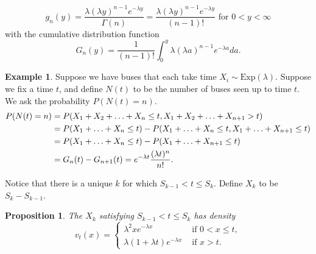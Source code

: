 \documentclass[15pt,a4paper]{book}
\newtheorem{proposition}[theorem]{Proposition}
\theoremstyle{definition}
\newtheorem{example}[theorem]{Example}
\begin{document}
\begin{equation}
    g_{n}(y) = \frac{\lambda(\lambda y)^{n-1}e^{-\lambda y}}{\Gamma(n)} = \frac{\lambda(\lambda y)^{n-1}e^{-\lambda y}}{(n-1)!} \text{ for } 0 < y < \infty
\end{equation}
with the cumulative distribution function
\begin{equation}
    G_{n}(y) = \frac{1}{(n-1)!} \int_{0}^{y} \lambda (\lambda a)^{n-1} e^{-\lambda a} da.
\end{equation}

\begin{example}
    Suppose we have buses that each take time $X_{i} \sim \text{Exp}(\lambda)$. Suppose we fix a time $t$, and define $N(t)$ to be the number of buses seen up to time $t$. We ask the probability $P(N(t)=n)$.
    \begin{align}
        P(N(t)=n) &= P(X_{1}+X_{2}+\ldots+X_{n} \leq t, X_{1}+X_{2}+\ldots+X_{n+1}>t) \\
        &= P(X_{1}+\ldots+X_{n} \leq t) - P(X_{1}+\ldots+X_{n} \leq t, X_{1}+\ldots+X_{n+1}\leq t) \notag \\
        &= P(X_{1}+\ldots+X_{n} \leq t) - P(X_{1} + \ldots + X_{n+1} \leq t) \notag \\
        &= G_{n}(t) - G_{n+1}(t) = e^{-\lambda t} \frac{(\lambda t)^{n}}{n!}.
    \end{align}
\end{example}
Notice that there is a unique $k$ for which $S_{k-1} < t \leq S_{k}$. Define $X_{k}$ to be $S_{k} - S_{k-1}$.
\begin{proposition}
    The $X_{k}$ satisfying $S_{k-1} < t \leq S_{k}$ has density
    \begin{equation}
        v_{t}(x) = \begin{cases}
            \lambda^{2}xe^{-\lambda x} &\text{ if } 0 < x \leq t,\\
            \lambda(1+\lambda t) e^{-\lambda x} &\text{ if } x > t.
        \end{cases}
    \end{equation}
\end{proposition}
\end{document}
